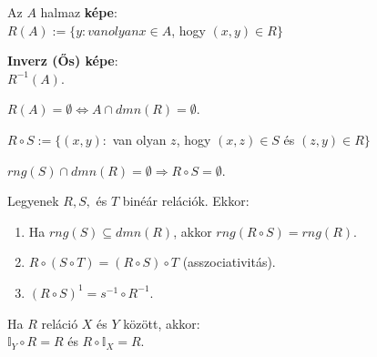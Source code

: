 \documentclass{beamer}
\newcommand{\mmedskip}{\vspace{0.5em}}
\begin{document}
\begin{frame}
\begin{tcolorbox}[title={Def.: Az $A$ halmaz képe, (ős)képe / inverz képe}]
Az $A$ halmaz \textbf{képe}:\\
$R(A) := \{ y : van olyan x \in A$, hogy $(x, y) \in R \}$\\
\mmedskip

\textbf{Inverz (Ős) képe}:\\
$R^{-1}(A)$.
\end{tcolorbox}

\begin{tcolorbox}[title={Ész}]
$R(A) = \emptyset \iff A \cap dmn(R) = \emptyset$.
\end{tcolorbox}

\begin{tcolorbox}[title={Def.: Az $S$ és $R$ binér relációk kompozíciója}]
$R \circ S := \{ (x, y) : $ van olyan $z$, hogy $(x, z) \in S$ és $(z, y) \in R \}$
\end{tcolorbox}

\begin{tcolorbox}[title={Ész}]
$rng(S) \cap dmn(R) = \emptyset \Rightarrow R \circ S = \emptyset$.
\end{tcolorbox}

\begin{tcolorbox}[title={Def.: Kompozíció tulajdonságai}]
Legyenek $R, S,$ és $T$ binéár relációk. Ekkor:\\
\begin{enumerate}
\item Ha $rng(S) \subseteq dmn(R)$, akkor $rng(R \circ S) = rng(R)$.
\item $R \circ (S \circ T) = (R \circ S) \circ T$ (asszociativitás).
\item $(R \circ S)^{1} = s^{-1} \circ R^{-1}$.
\end{enumerate}

Ha $R$ reláció $X$ és $Y$ között, akkor:\\
$\mathbb{I}_Y \circ R = R$ és $R \circ \mathbb{I}_X = R$.
\end{tcolorbox}
\end{frame}
\end{document}
